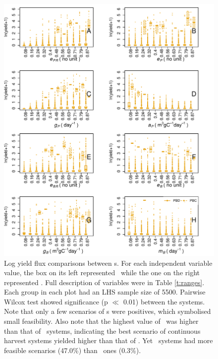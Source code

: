 \documentclass[../thesis.tex]{subfiles} %
\begin{document}
\begin{figure}[H]
    \centering
    \includegraphics[width=\linewidth]{result/harvB.pdf}
    \caption[Log yield flux comparisons between \pbs s]{Log yield flux comparisons between \pbs s.  For each independent variable value, the box on its left represented \PBN\ while the one on the right represented \PBH.  Full description of variables were in Table \ref{t:ranges}.  Each group in each plot had an LHS sample size of 5500.  Pairwise Wilcox test showed significance (p $\ll$ 0.01) between the systems.  Note that only a few scenarios of \pbs s were positives, which symbolised small feasibility.  Also note that the highest value of \PBH\ was higher than that of \PBN\ systems, indicating the best scenario of continuous harvest systems yielded higher than that of \PBN.  Yet \PBN\ systems had more feasible scenarios (47.0\%) than \PBH\ ones (0.3\%).}
    \label{f:harvPB}
\end{figure}
\end{document}
